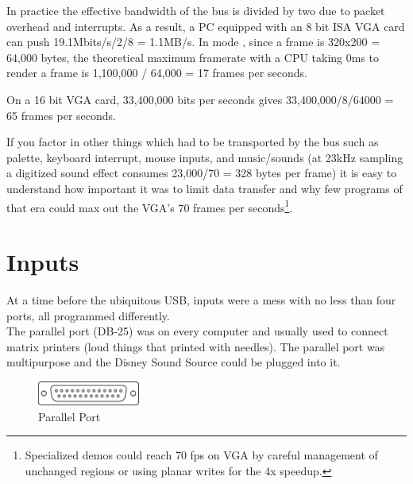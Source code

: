 \documentclass[book.tex]{subfiles}
\begin{document}
\par
 In practice the effective bandwidth of the bus is divided by two due to packet overhead and interrupts. As a result, a PC equipped with an 8 bit ISA VGA card can push 19.1Mbits/s/2/8 = 1.1MB/s. In mode , since a frame is 320x200 = 64,000 bytes, the theoretical maximum framerate with a CPU taking 0ms to render a frame is 1,100,000 / 64,000 = 17 frames per seconds.\\
 \par
 On a 16 bit VGA card, 33,400,000 bits per seconds gives 33,400,000/8/64000 = 65 frames per seconds.\\
 \par
 If you factor in other things which had to be transported by the bus such as palette, keyboard interrupt, mouse inputs, and music/sounds (at 23kHz sampling a digitized sound effect consumes 23,000/70 = 328 bytes per frame) it is easy to understand how important it was to limit data transfer and why few programs of that era could max out the VGA's 70 frames per seconds\footnote{Specialized demos could reach 70 fps on VGA by careful management of unchanged regions or using planar writes for the 4x speedup.}.














\section{Inputs}
At a time before the ubiquitous USB, inputs were a mess with no less than four ports, all programmed differently.\\

The parallel port (DB-25) was on every computer and usually used to connect matrix printers (loud things that printed with needles). The parallel port was multipurpose and the Disney Sound Source could be plugged into it.\\
\par
 \begin{figure}[H]
\centering
\includegraphics[width=0.3\textwidth]{imgs/drawings/ports/DB-25_parallel_port.eps}
\caption{Parallel Port}
\label{fig:parallelPort}
\end{figure}
\end{document}
